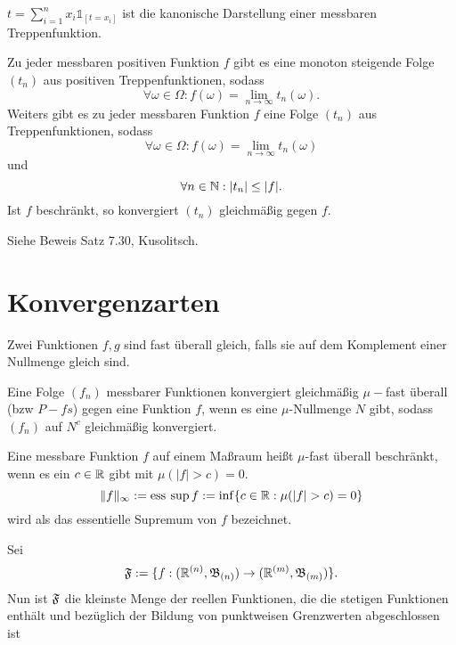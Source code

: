 			\begin{defi}
				$t=\sum_{i=1}^{n}x_i\mathds{1}_{[t=x_i]}$ ist die kanonische Darstellung einer messbaren Treppenfunktion. 
			\end{defi}
			
			\begin{satz}
				Zu jeder messbaren positiven Funktion $f$ gibt es eine monoton steigende Folge $(t_n)$ aus positiven Treppenfunktionen, sodass 
				\[ \forall \omega\in\Omega: f(\omega)=\lim_{n\to\infty} t_n(\omega). \]
				Weiters gibt es zu jeder messbaren Funktion $f$ eine Folge $(t_n)$ aus Treppenfunktionen, sodass 
				\[ \forall \omega\in\Omega: f(\omega)=\lim_{n\to\infty} t_n(\omega) \]
				und
				\[ \forall n\in\mathbb{N}: |t_n|\le |f|. \]
				Ist $f$ beschränkt, so konvergiert $(t_n)$ gleichmäßig gegen $f$. 
			\end{satz}
			
			\begin{bew}
				Siehe Beweis Satz 7.30, Kusolitsch. 
			\end{bew}
			
		\section{Konvergenzarten}
			\begin{defi}
				Zwei Funktionen $f,g$ sind fast überall gleich, falls sie auf dem Komplement einer Nullmenge gleich sind. 
			\end{defi}
			
			\begin{defi}
				Eine Folge $(f_n)$ messbarer Funktionen konvergiert gleichmäßig $\mu-$fast überall (bzw $P-fs$) gegen eine Funktion $f$, wenn es eine $\mu$-Nullmenge $N$ gibt, sodass $(f_n)$ auf $N^c$ gleichmäßig konvergiert. 
			\end{defi}
			
			\begin{defi}
				Eine messbare Funktion $f$ auf einem Maßraum heißt $\mu$-fast überall beschränkt, wenn es ein $c\in\mathbb{R}$ gibt mit $\mu(|f|>c)=0$.
				\[ \lVert f\rVert_\infty:=\esssup f:=\inf\{c\in\R: \mu(|f|>c)=0\} \]
				wird als das essentielle Supremum von $f$ bezeichnet. 
			\end{defi}
			
			\begin{satz}
				Sei \[ \mathfrak{F}:=\{f:(\mathbb{R}^{(n)},\mathfrak{B}_{(n)})\to(\mathbb{R}^{(m)},\mathfrak{B}_{(m)})\}. \]
				Nun ist $\mathfrak{F}$ die kleinste Menge der reellen Funktionen, die die stetigen Funktionen enthält und bezüglich der Bildung von punktweisen Grenzwerten abgeschlossen ist
			\end{satz}
			
